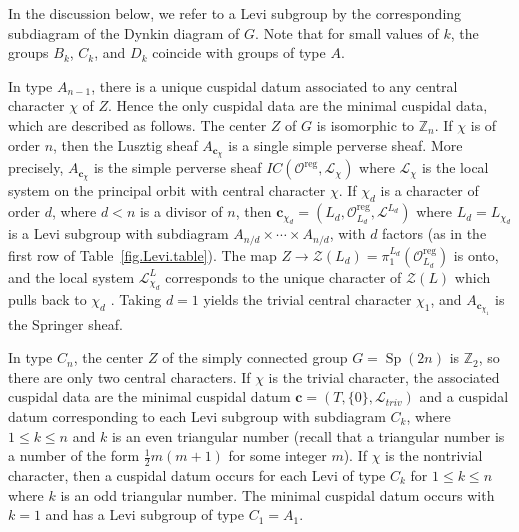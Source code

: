 \documentclass[reqno,11pt]{amsart}
\theoremstyle{remark}
\theoremstyle{remark}
\theoremstyle{definition}
\theoremstyle{definition}
\theoremstyle{definition}
\numberwithin{equation}{section}
\newcommand{\Z}{\mathbb{ Z}}           %
\newcommand{\Sp}{\operatorname{Sp}}
\newcommand{\cl}{\mathcal{L}}
\newcommand{\co}{\mathcal{O}}
\newcommand{\cz}{\mathcal{Z}}
\newcommand{\vc}{\mathbf{c}}
\newcommand{\reg}{\mathrm{reg}}
\begin{document}
In the discussion below, we refer to a Levi subgroup by the corresponding subdiagram of the Dynkin diagram of $G$.  Note
that for small values of $k$, the groups $B_k$, $C_k$, and $D_k$ coincide with groups of type $A$.

In type $A_{n-1}$, there is a unique cuspidal datum associated to any central character $\chi$ of $Z$. Hence the only cuspidal data
are the minimal cuspidal data, which are described as follows.
The center $Z$ of  $G$ is isomorphic to $\mathbb Z_n$.   If $\chi$ is of order $n$, then the Lusztig sheaf $A_{\vc_{\chi}}$  is a single simple perverse sheaf. More precisely, $A_{\vc_{\chi}}$ is the simple perverse sheaf $IC(\co^{\reg},\cl_\chi)$ where $\cl_\chi$ is the  local system on the principal orbit  with central character $\chi$.  If $\chi_d$ is a character of order $d$, where $d<n$ is a divisor of $n$, then
$\vc_{\chi_d} = (L_{d}, \co_{L_d}^{\reg}, \cl^{L_{d}})$ where $L_d = L_{\chi_d}$ is a Levi subgroup with subdiagram $A_{n/d}\times \cdots \times A_{n/d}$, with $d$ factors (as in the first row of Table~\ref{fig.Levi.table}). 
The map $Z \to \cz(L_d) = \pi_1^{L_d}(\co_{L_d}^{\reg})$ is onto, and the local system $\cl^L_{\chi_d}$ corresponds to the unique character of $\cz(L)$ which pulls back to $\chi_d$ . Taking $d = 1$ yields the trivial central character $\chi_1$, and $A_{\vc_{\chi_1}}$ is the Springer sheaf. 

In type $C_n$, the center $Z$ of the simply connected group $G = \Sp(2n)$ is $\Z_2$, so there are only two central characters.  If $\chi$ is the trivial character, the associated cuspidal data are the minimal cuspidal datum $\vc = (T, \{ 0 \}, \cl_{triv})$ and a cuspidal datum corresponding to each Levi subgroup with subdiagram $C_k$, where $1 \leq k \leq n$ and $k$ is an even triangular number (recall that a triangular number is a number of the form
$\frac{1}{2} m(m+1)$ for some integer $m$).  If $\chi$ is the nontrivial character, then a cuspidal datum occurs for each Levi of type $C_k$ for $1\leq k\leq n$ where $k$ is an odd triangular number.  The minimal cuspidal datum occurs with $k=1$ and has a Levi subgroup of type $C_1 = A_1$.
\end{document}
